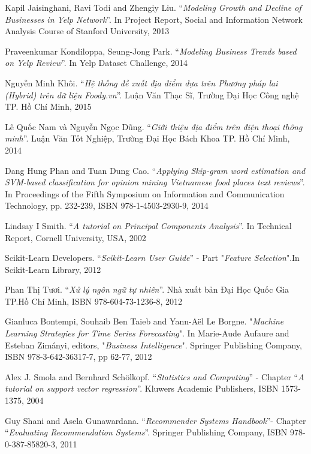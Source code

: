 \documentclass[12pt]{extarticle}
\begin{document}
\par [11]\hspace{9pt}Kapil Jaisinghani, Ravi Todi and Zhengiy Liu. “\textit{Modeling Growth and Decline of Businesses in Yelp Network}”. In Project Report, Social and Information Network Analysis Course of Stanford University, 2013
\par [12]\hspace{9pt}Praveenkumar Kondiloppa, Seung-Jong Park. “\textit{Modeling Business Trends based on Yelp Review}”. In Yelp Dataset Challenge, 2014 
\par [13]\hspace{9pt}Nguyễn Minh Khôi. “\textit{Hệ thống đề xuất địa điểm dựa trên Phương pháp lai (Hybrid) trên dữ liệu Foody.vn}”. Luận Văn Thạc Sĩ, Trường Đại Học Công nghệ TP. Hồ Chí Minh, 2015
\par [14]\hspace{9pt}Lê Quốc Nam và Nguyễn Ngọc Dũng. “\textit{Giới thiệu địa điểm trên điện thoại thông minh}”. Luận Văn Tốt Nghiệp, Trường Đại Học Bách Khoa TP. Hồ Chí Minh, 2014
\par [15]\hspace{9pt}Dang Hung Phan and Tuan Dung Cao. “\textit{Applying Skip-gram word estimation and SVM-based classification for opinion mining Vietnamese food places text reviews}”. In Proceedings of the Fifth Symposium on Information and Communication Technology, pp. 232-239, ISBN 978-1-4503-2930-9, 2014
\par [16]\hspace{9pt}Lindsay I Smith. “\textit{A tutorial on Principal Components Analysis}”. In Technical Report, Cornell University, USA, 2002
\par [17]\hspace{9pt}Scikit-Learn Developers. “\textit{Scikit-Learn User Guide}” - Part "\textit{Feature Selection}".In Scikit-Learn Library, 2012
\par [18]\hspace{9pt}Phan Thị Tươi. “\textit{Xử lý ngôn ngữ tự nhiên}”. Nhà xuất bản Đại Học Quốc Gia TP.Hồ Chí Minh, ISBN 978-604-73-1236-8, 2012
\par [19]\hspace{9pt}Gianluca Bontempi, Souhaib Ben Taieb and Yann-Aël Le Borgne. "\textit{Machine Learning Strategies for Time Series Forecasting}". In Marie-Aude Aufaure and Esteban Zimányi, editors, "\textit{Business Intelligence}". Springer Publishing Company, ISBN 978-3-642-36317-7, pp 62-77, 2012
\par [20]\hspace{9pt}Alex J. Smola and Bernhard Schölkopf. “\textit{Statistics and Computing}” - Chapter “\textit{A tutorial on support vector regression}”. Kluwers Academic Publishers, ISBN 1573-1375, 2004
\par [21]\hspace{9pt}Guy Shani and Asela Gunawardana. “\textit{Recommender Systems Handbook}”- Chapter “\textit{Evaluating Recommendation Systems}”. Springer Publishing Company, ISBN 978-0-387-85820-3, 2011
\end{document}
